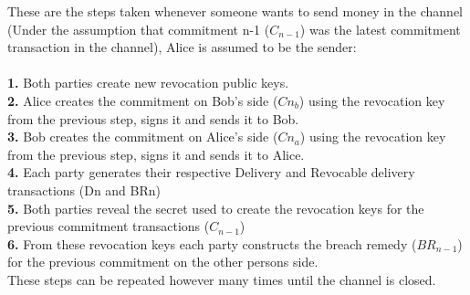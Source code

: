 These are the steps taken whenever someone wants to send money in the channel (Under the assumption that commitment n-1 ($C_{n-1}$) was the latest commitment transaction in the channel), Alice is assumed to be the sender:\\\\
	\textbf{1.} Both parties create new revocation public keys.\\
	\textbf{2.} Alice creates the commitment on Bob's side ($Cn_{b}$) using the revocation key from the previous step, signs it and sends it to Bob.\\
	\textbf{3.} Bob creates the commitment on Alice's side ($Cn_{a}$) using the revocation key from the previous step, signs it and sends it to Alice.\\
	\textbf{4.} Each party generates their respective Delivery and Revocable delivery transactions (Dn and BRn)\\
	\textbf{5.} Both parties reveal the secret used to create the revocation keys for the previous commitment transactions ($C_{n-1}$)\\
	\textbf{6.} From these revocation keys each party constructs the breach remedy ($BR_{n-1}$) for the previous commitment on the other persons side.\\

These steps can be repeated however many times until the channel is closed. 

